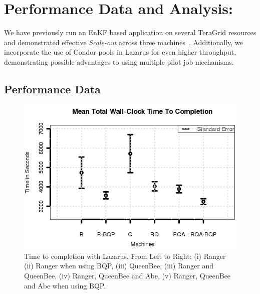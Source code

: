 \documentclass{rspublic}
\newcommand{\jhanote}[1]{ {\textcolor{red} { ***Jha: #1 }}}
\newcommand{\yyenote}[1]{ {\textcolor{blue} { ***yye00: #1 }}}
\newcommand{\jhanote}[1]{}
\newcommand{\yyenote}[1]{}
\begin{document}
\section{Performance Data and Analysis:} 

We have previously run an EnKF based application on several TeraGrid
resources and demonstrated effective {\it Scale-out} across three
machines~\citep{gmac}.  Additionally, we incorporate the use of Condor
pools in Lazarus for even higher throughput, demonstrating possible
advantages to using multiple pilot job mechanisms. %

\subsection{Performance Data} 

\begin{figure}
\begin{center}
  \includegraphics*[scale=0.5,angle=0]{figures/Figure7.png}
\end{center}
\caption{Time to completion with Lazarus. From Left to Right: (i)
  Ranger (ii) Ranger when using BQP, (iii) QueenBee, (iii) Ranger and
  QueenBee, (iv) Ranger, QueenBee and Abe, (v) Ranger, QueenBee and
  Abe when using BQP.}
\label{fig:SingleVsDistributed}
\end{figure}


\end{document}
